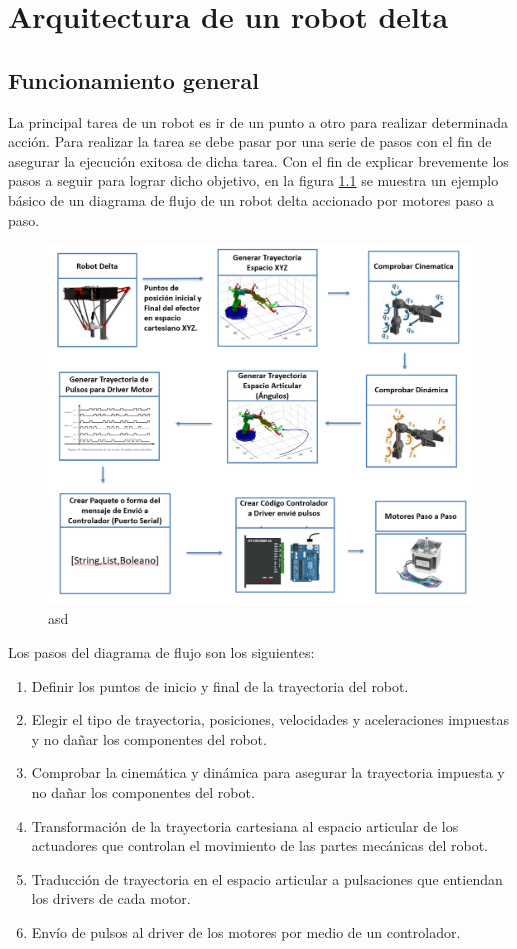 \chapter{Arquitectura de un robot delta}\label{CAP3}

\section{Funcionamiento general}

La principal tarea de un robot es ir de un punto a otro para realizar determinada acción. Para realizar la tarea se debe pasar por una serie de pasos con el fin de asegurar la ejecución exitosa de dicha tarea. Con el fin de explicar brevemente los pasos a seguir para lograr dicho objetivo, en la figura \ref{f:Cap3-1_diagrama_de_flujo_robot_accion} se muestra un ejemplo básico de un diagrama de flujo de un robot delta accionado por motores paso a paso.

    \begin{figure}[htb]
        \centering
        \includegraphics[width=0.8\linewidth]{Main/Chapter3/Images3/3-1/diagrama-de-flujo-robot.png}
        \caption{asd}
        \label{f:Cap3-1_diagrama_de_flujo_robot_accion}
    \end{figure}
    
Los pasos del diagrama de flujo son los siguientes:

\begin{enumerate}
    \item Definir los puntos de inicio y final de la trayectoria del robot.
    \item Elegir el tipo de trayectoria, posiciones, velocidades y aceleraciones impuestas y no dañar los componentes del robot.
    \item Comprobar la cinemática y dinámica para asegurar la trayectoria impuesta y no dañar los componentes del robot.
    \item Transformación de la trayectoria cartesiana al espacio articular de los actuadores que controlan el movimiento de las partes mecánicas del robot.
    \item Traducción de trayectoria en el espacio articular a pulsaciones que entiendan los drivers de cada motor.
    \item Envío de pulsos al driver de los motores por medio de un controlador.
\end{enumerate}

